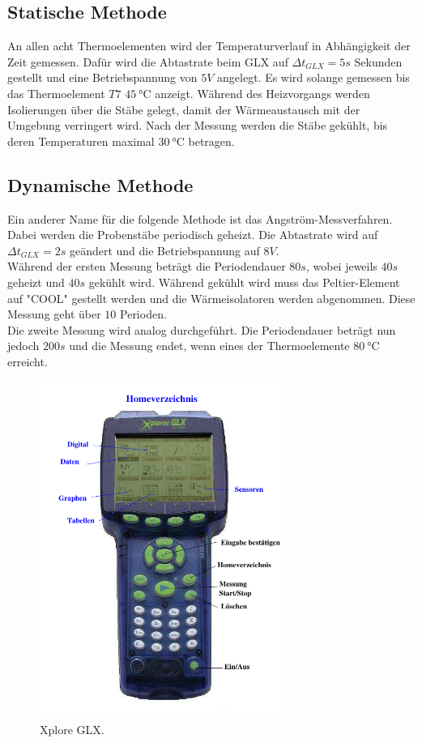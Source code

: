 \subsection{Statische Methode}
\label{subsec:durch_stat}
An allen acht Thermoelementen wird der Temperaturverlauf in Abhängigkeit der Zeit gemessen.
Dafür wird die Abtastrate beim GLX auf $\Delta t_{GLX} = 5\si{s}$ Sekunden gestellt und eine Betriebspannung von $5 \si{V}$ angelegt.
Es wird solange gemessen bis das Thermoelement $T7$ $\qty{45}{\degreeCelsius}$ anzeigt.
Während des Heizvorgangs werden Isolierungen über die Stäbe gelegt, damit der Wärmeaustausch mit der Umgebung verringert wird.
Nach der Messung werden die Stäbe gekühlt, bis deren Temperaturen maximal $\qty{30}{\degreeCelsius}$ betragen.

\subsection{Dynamische Methode}
\label{subsec:durch_dyn}
Ein anderer Name für die folgende Methode ist das Angström-Messverfahren.
Dabei werden die Probenstäbe periodisch geheizt.
Die Abtastrate wird auf $\Delta t_{GLX} = 2\si{s}$ geändert und die Betriebspannung auf $8 \si{V}$.\\
Während der ersten Messung beträgt die Periodendauer $80\si{s}$, wobei jeweils $40\si{s}$ geheizt und $40\si{s}$ gekühlt wird.
Während gekühlt wird muss das Peltier-Element auf "COOL" gestellt werden und die Wärmeisolatoren werden abgenommen.
Diese Messung geht über $10$ Perioden.\\
Die zweite Messung wird analog durchgeführt. 
Die Periodendauer beträgt nun jedoch $200 \si{s}$ und die Messung endet, wenn eines der Thermoelemente $\qty{80}{\degreeCelsius}$ erreicht.

\begin{figure}[H]
    \centering
    \includegraphics[height=11cm]{content/Abb_2.pdf}
    \caption{Xplore GLX.\cite[5]{V204}}
    \label{fig:GLX}
\end{figure}

